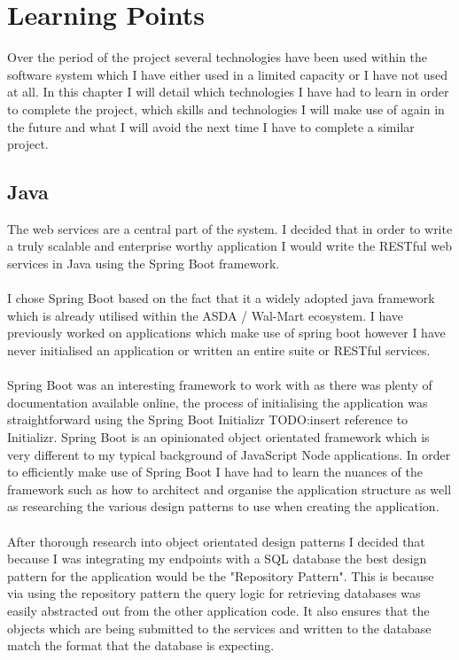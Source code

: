 \documentclass[a4paper,11pt]{report}
\begin{document}

\chapter{Learning Points}
Over the period of the project several technologies have been used within the software system
which I have either used in a limited capacity or I have not used at all. In this chapter I will
detail which technologies I have had to learn in order to complete the project, which skills and 
technologies I will make use of again in the future and what I will avoid the next time I have to 
complete a similar project.

\section{Java}
The web services are a central part of the system. I decided that in order to write a truly scalable
and enterprise worthy application I would write the RESTful web services in Java using the Spring Boot framework.
\\
\\
I chose Spring Boot based on the fact that it a widely adopted java framework which is already utilised
within the ASDA / Wal-Mart ecosystem. I have previously worked on applications which make use of spring
boot however I have never initialised an application or written an entire suite or RESTful services.
\\
\\
Spring Boot was an interesting framework to work with as there was plenty of documentation available online,
the process of initialising the application was straightforward using the Spring Boot Initializr TODO:insert reference to Initializr. 
Spring Boot is an opinionated object orientated framework which is very different to my typical background 
of JavaScript Node applications. In order to efficiently make use of Spring Boot I have had to learn the nuances
of the framework such as how to architect and organise the application structure as well as 
researching the various design patterns to use when creating the application. 
\\
\\
After thorough research into object orientated design patterns I decided that because I was integrating my endpoints
with a SQL database the best design pattern for the application would be the "Repository Pattern". This is because 
via using the repository pattern the query logic for retrieving databases was easily abstracted out from the other 
application code. It also ensures that the objects which are being submitted to the services and written to the database
match the format that the database is expecting.
\\
\\
\end{document}
